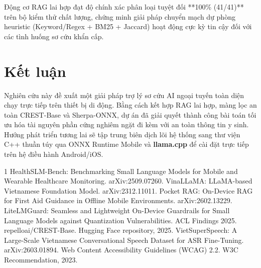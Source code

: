 \documentclass[journal]{IEEEtran}
\begin{document}
Động cơ RAG lai hợp đạt độ chính xác phân loại tuyệt đối **100\% (41/41)** trên bộ kiểm thử chất lượng, chứng minh giải pháp chuyển mạch dự phòng heuristic (Keyword/Regex + BM25 + Jaccard) hoạt động cực kỳ tin cậy đối với các tình huống sơ cứu khẩn cấp.

\section{Kết luận}
Nghiên cứu này đề xuất một giải pháp trợ lý sơ cứu AI ngoại tuyến toàn diện chạy trực tiếp trên thiết bị di động. Bằng cách kết hợp RAG lai hợp, màng lọc an toàn CREST-Base và Sherpa-ONNX, dự án đã giải quyết thành công bài toán tối ưu hóa tài nguyên phần cứng nghiêm ngặt đi kèm với an toàn thông tin y sinh. Hướng phát triển tương lai sẽ tập trung biên dịch lõi hệ thống sang thư viện C++ thuần túy qua ONNX Runtime Mobile và \textbf{llama.cpp} để cài đặt trực tiếp trên hệ điều hành Android/iOS.

\begin{thebibliography}{1}
HealthSLM-Bench: Benchmarking Small Language Models for Mobile and Wearable Healthcare Monitoring. arXiv:2509.07260.
VinaLLaMA: LLaMA-based Vietnamese Foundation Model. arXiv:2312.11011.
Pocket RAG: On-Device RAG for First Aid Guidance in Offline Mobile Environments. arXiv:2602.13229.
LiteLMGuard: Seamless and Lightweight On-Device Guardrails for Small Language Models against Quantization Vulnerabilities. ACL Findings 2025.
repelloai/CREST-Base. Hugging Face repository, 2025.
VietSuperSpeech: A Large-Scale Vietnamese Conversational Speech Dataset for ASR Fine-Tuning. arXiv:2603.01894.
Web Content Accessibility Guidelines (WCAG) 2.2. W3C Recommendation, 2023.
\end{thebibliography}
\end{document}
